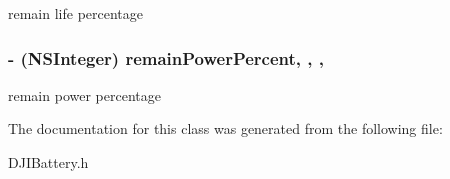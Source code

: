 remain life percentage \hypertarget{interface_d_j_i_battery_a79eeca54fbd09a177ae67d1173d70396}{
\subsubsection[{remain\+Power\+Percent}]{\setlength{\rightskip}{0pt plus 5cm}-\/ (N\+S\+Integer) remain\+Power\+Percent\hspace{0.3cm}{\ttfamily [read]}, {\ttfamily [write]}, {\ttfamily [nonatomic]}, {\ttfamily [assign]}}}\label{interface_d_j_i_battery_a79eeca54fbd09a177ae67d1173d70396}
remain power percentage 

The documentation for this class was generated from the following file\+:\begin{DoxyCompactItemize}
\item 
D\+J\+I\+Battery.\+h\end{DoxyCompactItemize}
